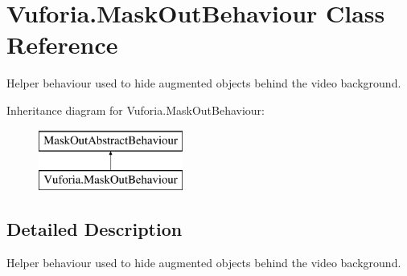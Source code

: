 \hypertarget{class_vuforia_1_1_mask_out_behaviour}{}\section{Vuforia.\+Mask\+Out\+Behaviour Class Reference}
\label{class_vuforia_1_1_mask_out_behaviour}


Helper behaviour used to hide augmented objects behind the video background.  


Inheritance diagram for Vuforia.\+Mask\+Out\+Behaviour\+:\begin{figure}[H]
\begin{center}
\leavevmode
\includegraphics[height=2.000000cm]{class_vuforia_1_1_mask_out_behaviour}
\end{center}
\end{figure}


\subsection{Detailed Description}
Helper behaviour used to hide augmented objects behind the video background. 

